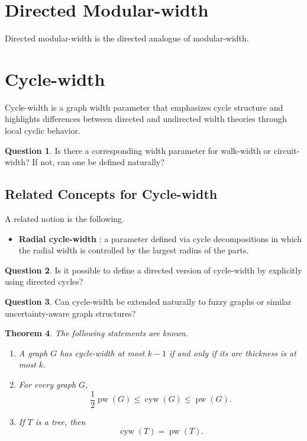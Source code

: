 \documentclass[10pt]{book}
\newtheorem{theorem}{Theorem}[section]
\theoremstyle{definition}
\newtheorem{question}[theorem]{Question}
\begin{document}
\section{Directed Modular-width}
Directed modular-width \cite{356} is the directed analogue of modular-width.

\section{Cycle-width}
Cycle-width \cite{366,weincyclewidth} is a graph width parameter that emphasizes cycle structure and highlights differences between directed and undirected width theories through local cyclic behavior.

\begin{question}
Is there a corresponding width parameter for walk-width or circuit-width? If not, can one be defined naturally?
\end{question}

\subsection{Related Concepts for Cycle-width}
A related notion is the following.

\begin{itemize}
    \item \textbf{Radial cycle-width} \cite{albrechtsen2023structural}: a parameter defined via cycle decompositions in which the radial width is controlled by the largest radius of the parts.
\end{itemize}

\begin{question}
Is it possible to define a directed version of cycle-width by explicitly using directed cycles?
\end{question}

\begin{question}
Can cycle-width be extended naturally to fuzzy graphs or similar uncertainty-aware graph structures?
\end{question}

\begin{theorem}
The following statements are known.
\begin{enumerate}
    \item A graph \(G\) has cycle-width at most \(k-1\) if and only if its arc thickness is at most \(k\). \cite{weincyclewidth}

    \item For every graph \(G\),
    \[
    \frac{1}{2}\operatorname{pw}(G)\leq \operatorname{cyw}(G)\leq \operatorname{pw}(G).
    \]
    \cite{weincyclewidth}

    \item If \(T\) is a tree, then
    \[
    \operatorname{cyw}(T)=\operatorname{pw}(T).
    \]
    \cite{weincyclewidth}
\end{enumerate}
\end{theorem}
\end{document}
